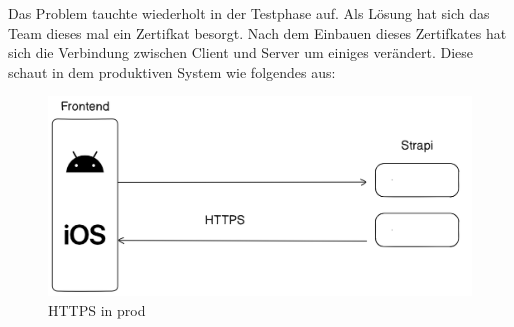 \begin{spacing}{1}
    Das Problem tauchte wiederholt in der Testphase auf. Als Lösung hat sich das Team dieses mal ein Zertifkat besorgt. Nach dem Einbauen dieses Zertifkates hat sich die Verbindung zwischen Client und Server um einiges verändert. Diese schaut in dem produktiven System wie folgendes aus:
    \begin{figure}[H]
        \centering
        \includegraphics*[width=\textwidth]{./pics/https.png}
        \caption{HTTPS in prod}
    \end{figure}





\end{spacing}
